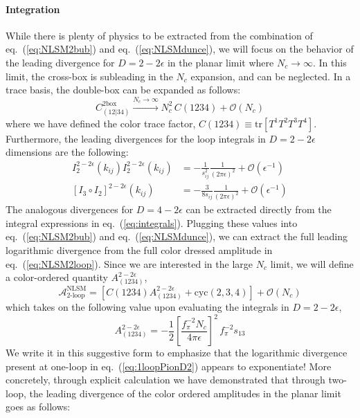 \documentclass[11pt,letter]{article}
\def\eqn#1{eq.~(\ref{#1})}
\begin{document}
\paragraph{\textbf{Integration}} While there is plenty of physics to be extracted from the combination of \eqn{eq:NLSM2bub} and \eqn{eq:NLSMdunce}, we will focus on the behavior of the leading divergence for $D=2-2\epsilon$ in the planar limit where $N_c \rightarrow \infty$. In this limit, the cross-box is subleading in the $N_c$ expansion, and can be neglected. In a trace basis, the double-box can be expanded as follows:
\begin{equation}
C^{\text{2box}}_{(12|34)} \xrightarrow{N_c\rightarrow\infty } N_c^2\, C(1234) +\mathcal{O}(N_c)
\end{equation}
where we have defined the color trace factor, $C(1234)\equiv  \text{tr}[T^1T^2 T^3 T^4]$. Furthermore, the leading divergences for the loop integrals in $D=2-2\epsilon$ dimensions are the following:
\begin{align}
I_2^{2-2\epsilon}(k_{ij})I_2^{2-2\epsilon}(k_{ij}) &= -\frac{1}{s_{ij }^2}\frac{1}{(2\pi \epsilon)^2} + \mathcal{O}(\epsilon^{-1}) 
\\
 [I_3\circ I_2]^{2-2\epsilon}{(k_{ij})} &= -\frac{3}{8s_{ij }}\frac{1}{(2\pi \epsilon)^2} + \mathcal{O}(\epsilon^{-1}) 
\end{align}
The analogous divergences for $D=4-2\epsilon$ can be extracted directly from the integral expressions in \eqn{eq:integrals}. Plugging these values into \eqn{eq:NLSM2bub} and \eqn{eq:NLSMdunce}, we can extract the full leading logarithmic divergence from the full color dressed amplitude in \eqn{eq:NLSM2loop}. Since we are interested in the large $N_c$ limit, we will define a color-ordered quantity $A^{2-2\epsilon}_{(1234)}$, 
\begin{equation}
\mathcal{A}^{\text{NLSM}}_{\text{2-loop}} = \left[C(1234)A^{2-2\epsilon}_{(1234)}+\text{cyc}(2,3,4)\right] + \mathcal{O}(N_c)
\end{equation}
which takes on the following value upon evaluating the integrals in $D=2-2\epsilon$,
\begin{equation}
A^{2-2\epsilon}_{(1234)} = -\frac{1}{2}\left[\frac{f_{\pi}^{-2}N_c }{4\pi \epsilon}\right]^2 \,f_\pi^{-2}s_{13} 
\end{equation}
We write it in this suggestive form to emphasize that the logarithmic divergence present at one-loop in \eqn{eq:1loopPionD2} appears to exponentiate! More concretely, through explicit calculation we have demonstrated that through two-loop, the leading divergence of the color ordered amplitudes in the planar limit goes as follows:
\end{document}
